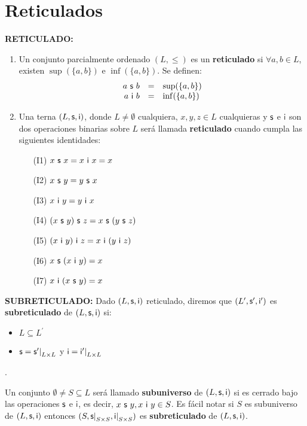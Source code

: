 \section{Reticulados}

  \PN \textbf{RETICULADO:}
  \begin{enumerate}
    \item Un conjunto parcialmente ordenado $(L,\leq)$ es un \textbf{reticulado} si $\forall a, b \in L$, existen
    $\sup(\{a,b\})$ e $\inf(\{a,b\})$. Se definen:
    \[
      \begin{array}{rcl}
        a \ \mathsf{s} \ b &=& \sup(\{a,b\}) \\
        a \ \mathsf{i} \ b &=& \inf(\{a,b\})
      \end{array}
    \]

    \item Una terna $(L, \mathsf{s},\mathsf{i})$, donde $L \neq \emptyset$ cualquiera, $x, y, z \in L$ cualquieras y $\mathsf{s}$ e
    $\mathsf{i}$ son dos operaciones binarias sobre $L$ será llamada \textbf{reticulado} cuando cumpla las siguientes
    identidades:
    \begin{enumerate}
      \item[(I1)] $x \ \mathsf{s} \ x = x \ \mathsf{i} \ x = x$
      \item[(I2)] $x \ \mathsf{s} \ y = y \ \mathsf{s} \ x$
      \item[(I3)] $x \ \mathsf{i} \ y = y \ \mathsf{i} \ x$
      \item[(I4)] $(x \ \mathsf{s} \ y) \ \mathsf{s} \ z = x \ \mathsf{s} \ (y \ \mathsf{s} \ z)$
      \item[(I5)] $(x \ \mathsf{i} \ y) \ \mathsf{i} \ z = x \ \mathsf{i} \ (y \ \mathsf{i} \ z)$
      \item[(I6)] $x \ \mathsf{s} \ (x \ \mathsf{i} \ y) = x$
      \item[(I7)] $x \ \mathsf{i} \ (x \ \mathsf{s} \ y) = x$
    \end{enumerate}
  \end{enumerate}

  \vspace{3mm}
  \PN \textbf{SUBRETICULADO:} Dado $(L, \mathsf{s}, \mathsf{i})$ reticulado, diremos que $(L^{\prime}, \mathsf{s}^{\prime}, \mathsf{i}^{\prime})$ es
  \textbf{subreticulado} de $(L, \mathsf{s}, \mathsf{i})$ si:
  \begin{itemize}
    \item $L \subseteq L^{\prime}$
    \item $\mathsf{s} = \mathsf{s}^{\prime}\mathrm{\mid}_{L \times L}$ y $\mathsf{i} = \mathsf{i}^{\prime}\mathrm{\mid}_{L \times L}$
  \end{itemize}.

  \PN Un conjunto $\emptyset \neq S \subseteq L$ será llamado \textbf{subuniverso} de $(L, \mathsf{s}, \mathsf{i})$ si es cerrado bajo
  las operaciones $\mathsf{s}$ e $\mathsf{i}$, es decir, $x \ \mathsf{s} \ y, x \ \mathsf{i} \ y \in S$. Es fácil notar si $S$ es subuniverso de
  $(L, \mathsf{s}, \mathsf{i})$ entonces $(S, \mathsf{s}\mathrm{\mid}_{S \times S}, \mathsf{i}\mathrm{\mid}_{S \times S})$ es \textbf{subreticulado}
  de $(L, \mathsf{s}, \mathsf{i})$.

